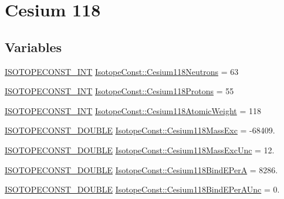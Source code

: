 \hypertarget{group___isotope_const-_cesium-_cs118}{}\section{Cesium 118}
\label{group___isotope_const-_cesium-_cs118}
\subsection*{Variables}
\begin{DoxyCompactItemize}
\item 
\mbox{\hyperlink{group___isotope_const-_macros_ga5f18360b3e99483a35c32d789e62621c}{I\+S\+O\+T\+O\+P\+E\+C\+O\+N\+S\+T\+\_\+\+I\+NT}} \mbox{\hyperlink{group___isotope_const-_cesium-_cs118_gae2dee11c6df659f78da0e50a22880ace}{Isotope\+Const\+::\+Cesium118\+Neutrons}} = 63
\item 
\mbox{\hyperlink{group___isotope_const-_macros_ga5f18360b3e99483a35c32d789e62621c}{I\+S\+O\+T\+O\+P\+E\+C\+O\+N\+S\+T\+\_\+\+I\+NT}} \mbox{\hyperlink{group___isotope_const-_cesium-_cs118_gae2f4443d69d670dbdb8da25d2351fd25}{Isotope\+Const\+::\+Cesium118\+Protons}} = 55
\item 
\mbox{\hyperlink{group___isotope_const-_macros_ga5f18360b3e99483a35c32d789e62621c}{I\+S\+O\+T\+O\+P\+E\+C\+O\+N\+S\+T\+\_\+\+I\+NT}} \mbox{\hyperlink{group___isotope_const-_cesium-_cs118_ga8fdfb58947e2294dced3b26bc41edb10}{Isotope\+Const\+::\+Cesium118\+Atomic\+Weight}} = 118
\item 
\mbox{\hyperlink{group___isotope_const-_macros_ga8f45a7272ce02c0b4c65c44636ed719a}{I\+S\+O\+T\+O\+P\+E\+C\+O\+N\+S\+T\+\_\+\+D\+O\+U\+B\+LE}} \mbox{\hyperlink{group___isotope_const-_cesium-_cs118_ga6060957cc6eac42d454327f6be6c5465}{Isotope\+Const\+::\+Cesium118\+Mass\+Exc}} = -\/68409.
\item 
\mbox{\hyperlink{group___isotope_const-_macros_ga8f45a7272ce02c0b4c65c44636ed719a}{I\+S\+O\+T\+O\+P\+E\+C\+O\+N\+S\+T\+\_\+\+D\+O\+U\+B\+LE}} \mbox{\hyperlink{group___isotope_const-_cesium-_cs118_ga632e5549a52368dc7aaab790df073091}{Isotope\+Const\+::\+Cesium118\+Mass\+Exc\+Unc}} = 12.
\item 
\mbox{\hyperlink{group___isotope_const-_macros_ga8f45a7272ce02c0b4c65c44636ed719a}{I\+S\+O\+T\+O\+P\+E\+C\+O\+N\+S\+T\+\_\+\+D\+O\+U\+B\+LE}} \mbox{\hyperlink{group___isotope_const-_cesium-_cs118_ga2b340f9a384f208f9b9ccdad104854b8}{Isotope\+Const\+::\+Cesium118\+Bind\+E\+PerA}} = 8286.
\item 
\mbox{\hyperlink{group___isotope_const-_macros_ga8f45a7272ce02c0b4c65c44636ed719a}{I\+S\+O\+T\+O\+P\+E\+C\+O\+N\+S\+T\+\_\+\+D\+O\+U\+B\+LE}} \mbox{\hyperlink{group___isotope_const-_cesium-_cs118_gad4b82ab43ee3522aae0a79fdd87628ef}{Isotope\+Const\+::\+Cesium118\+Bind\+E\+Per\+A\+Unc}} = 0.

\end{DoxyCompactItemize}
